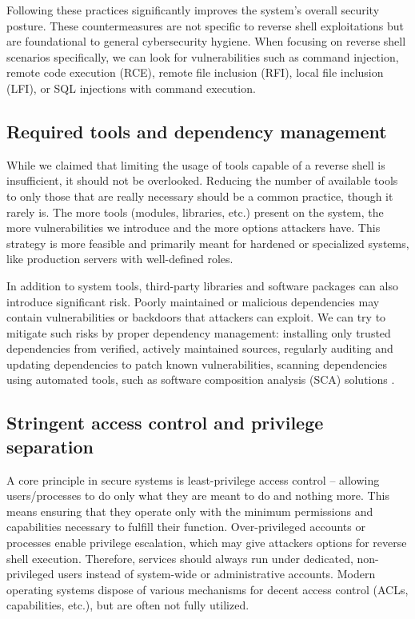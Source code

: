 Following these practices significantly improves the system's overall security posture. These countermeasures are not specific to reverse shell exploitations but are foundational to general cybersecurity hygiene. When focusing on reverse shell scenarios specifically, we can look for vulnerabilities such as command injection, remote code execution (RCE), remote file inclusion (RFI), local file inclusion (LFI), or SQL injections with command execution.


\subsection{Required tools and dependency management}

While we claimed that limiting the usage of tools capable of a reverse shell is insufficient, it should not be overlooked. Reducing the number of available tools to only those that are really necessary should be a common practice, though it rarely is. The more tools (modules, libraries, etc.) present on the system, the more vulnerabilities we introduce and the more options attackers have. This strategy is more feasible and primarily meant for hardened or specialized systems, like production servers with well-defined roles.

In addition to system tools, third-party libraries and software packages can also introduce significant risk. Poorly maintained or malicious dependencies may contain vulnerabilities or backdoors that attackers can exploit. We can try to mitigate such risks by proper dependency management:
installing only trusted dependencies from verified, actively maintained sources,
regularly auditing and updating dependencies to patch known vulnerabilities,
scanning dependencies using automated tools, such as software composition analysis (SCA) solutions \cite{sca-wiki}.


\subsection{Stringent access control and privilege separation}

A core principle in secure systems is least-privilege access control -- allowing users/processes to do only what they are meant to do and nothing more. This means ensuring that they operate only with the minimum permissions and capabilities necessary to fulfill their function. Over-privileged accounts or processes enable privilege escalation, which may give attackers options for reverse shell execution. Therefore, services should always run under dedicated, non-privileged users instead of system-wide or administrative accounts. Modern operating systems dispose of various mechanisms for decent access control (ACLs, capabilities, etc.), but are often not fully utilized.

